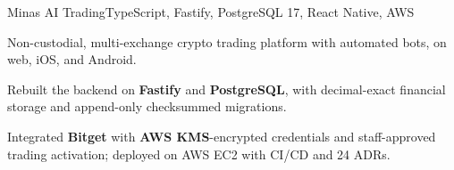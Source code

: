 \begin{cvproject}{Minas AI Trading}{TypeScript, Fastify, PostgreSQL 17, React Native, AWS}
  \item Non-custodial, multi-exchange crypto trading platform with automated bots, on web, iOS, and Android.
  \item Rebuilt the backend on \textbf{Fastify} and \textbf{PostgreSQL}, with decimal-exact financial storage and append-only checksummed migrations.
  \item Integrated \textbf{Bitget} with \textbf{AWS KMS}-encrypted credentials and staff-approved trading activation; deployed on AWS EC2 with CI/CD and 24 ADRs.
\end{cvproject}

